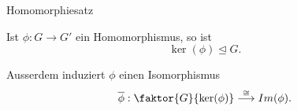 \documentclass[class=article, crop=false]{standalone}
\begin{document}
\begin{zettel}{Homomorphiesatz}
\begin{flashcard}[]{}
	Ist $\phi : G \longrightarrow  G'$ ein Homomorphismus, so ist \[
		\ker (\phi ) \trianglelefteq G
	.\]

	Ausserdem induziert $\phi $  einen Isomorphismus
	\[
		\bar{\phi } : \faktor{G}{ \ker (\phi )} \stackrel{\cong}{\longrightarrow} Im(\phi )
	.\]
\end{flashcard}
\end{zettel}
\end{document}
